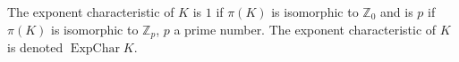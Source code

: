 The exponent characteristic of $K$ is $1$ if $\pi(K)$ is isomorphic to $\mathbb{Z}_0$ and is $p$ if $\pi(K)$ is isomorphic to $\mathbb{Z}_p$, $p$ a prime number. The exponent characteristic of $K$ is denoted $\operatorname{Exp Char} K$.
